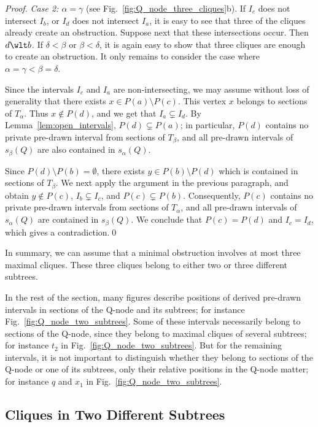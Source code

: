\begin{proof}
\emph{Case 2: $\alpha = \gamma$} (see Fig.~\ref{fig:Q_node_three_cliques}b). If $I_c$ does not
intersect $I_b$, or $I_d$ does not intersect $I_a$, it is easy to see that three of the cliques
already create an obstruction. Suppose next that these intersections occur. Then $d \wlt b$. If
$\delta < \beta$ or $\beta < \delta$, it is again easy to show that three cliques are enough to
create an obstruction. It only remains to consider the case where $\alpha = \gamma < \beta =
\delta$.

Since the intervals $I_c$ and $I_a$ are non-intersecting, we may assume without loss of generality
that there exists $x \in P(a) \setminus P(c)$. This vertex $x$ belongs to sections of $T_\alpha$.
Thus $x \notin P(d)$, and we get that $I_a \subsetneq I_d$. By Lemma~\ref{lem:open_intervals}, $P(d)
\subsetneq P(a)$; in particular, $P(d)$ contains no private pre-drawn interval from sections of
$T_\beta$, and all pre-drawn intervals of $s_\beta(Q)$ are also contained in $s_\alpha(Q)$.

Since $P(d) \setminus P(b) = \emptyset$, there exists $y \in P(b) \setminus P(d)$ which is contained
in sections of $T_\beta$. We next apply the argument in the previous paragraph, and obtain $y \notin
P(c)$, $I_b \subsetneq I_c$, and $P(c) \subsetneq P(b)$. Consequently, $P(c)$ contains no private
pre-drawn intervals from sections of $T_\alpha$, and all pre-drawn intervals of $s_\alpha(Q)$ are
contained in $s_\beta(Q)$. We conclude that $P(c) = P(d)$ and $I_c = I_d$, which gives a
contradiction.\qed
\end{proof}

In summary, we can assume that a minimal obstruction involves at most three maximal cliques.  These
three cliques belong to either two or three different subtrees.

In the rest of the section, many figures describe positions of derived pre-drawn intervals in
sections of the Q-node and its subtrees; for instance Fig.~\ref{fig:Q_node_two_subtrees}. Some of
these intervals necessarily belong to sections of the Q-node, since they belong to maximal cliques
of several subtrees; for instance $t_2$ in Fig.~\ref{fig:Q_node_two_subtrees}. But for the remaining
intervals, it is not important to distinguish whether they belong to sections of the Q-node or one
of its subtrees, only their relative positions in the Q-node matter; for instance $q$ and $x_1$ in
Fig.~\ref{fig:Q_node_two_subtrees}.

\subsection{Cliques in Two Different Subtrees} \label{sec:q_nodes_two_subtrees}

